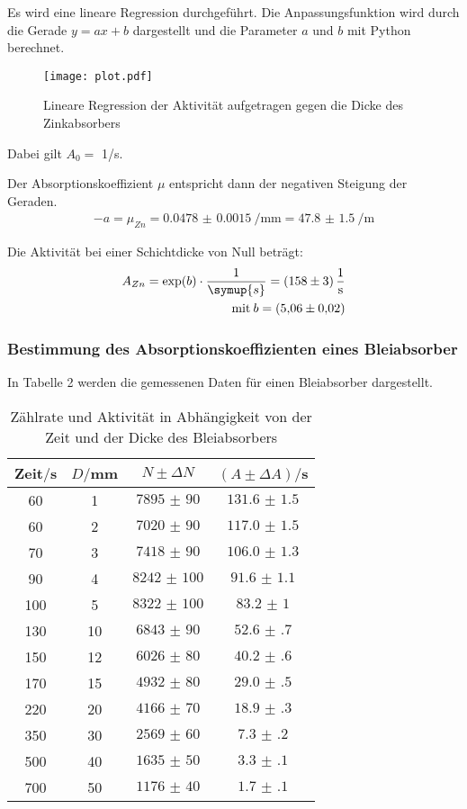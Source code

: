 Es wird eine lineare Regression durchgeführt. Die Anpassungsfunktion wird durch die Gerade $y = ax + b$  dargestellt und die Parameter $a$ und $b$
mit Python berechnet.

\begin{figure}[H]
  \centering
  \texttt{[image: plot.pdf]}
  \caption{Lineare Regression der Aktivität aufgetragen gegen die Dicke des Zinkabsorbers}
  \label{fig:plot}
\end{figure}

Dabei gilt $A_0 =$ 1/s.

Der Absorptionskoeffizient $\mu$ entspricht dann der negativen Steigung der Geraden.
\begin{align*}
  -a = \mu_{Zn} = \SI{0.0478(15)}{\per\milli\meter} = \SI{47.8(15)}{\per\meter}
\end{align*}

Die Aktivität bei einer Schichtdicke von Null beträgt:
\begin{align*}
  A_{Zn} = \exp(b) \cdot \frac{1}{\symup{s}} = \SI{158(3)}{\per\second} \\
  \text{mit} \: b = \SI{5.06(2)}{}
\end{align*}

\subsubsection{Bestimmung des Absorptionskoeffizienten eines Bleiabsorber}

In Tabelle 2 werden die gemessenen Daten für einen Bleiabsorber dargestellt.

\begin{table}[H]
  \centering
  \caption{Zählrate und Aktivität in Abhängigkeit von der Zeit und der Dicke des Bleiabsorbers}
  \label{tab:Rechteckspannung}
  \begin{tabular}{c c c c}
    \toprule
    Zeit$/$s & $D/$mm & $N \pm \Delta N$ & $(A \pm \Delta A)/$s\\
    \midrule
    60 & 1 & $\num{7895(90)}$  &  $\num{131.6(15)}$ \\
    60 & 2 & $\num{7020(90)}$ &   $\num{117.0(15)}$ \\
    70 & 3 & $\num{7418(90)}$ &   $\num{106.0(13)}$ \\
    90 & 4 & $\num{8242(100)}$ &  $\num{91.6(11)}$ \\
    100 & 5 & $\num{8322(100)}$ & $\num{83.2(10)}$ \\
    130 & 10 & $\num{6843(90)}$ & $\num{52.6(7)}$ \\
    150 & 12 & $\num{6026(80)}$ & $\num{40.2(6)}$ \\
    170 & 15 & $\num{4932(80)}$ & $\num{29.0(5)}$ \\
    220 & 20 & $\num{4166(70)}$ & $\num{18.9(3)}$ \\
    350 & 30 & $\num{2569(60)}$ & $\num{7.3(2)}$ \\
    500 & 40 & $\num{1635(50)}$ & $\num{3.3(1)}$ \\
    700 & 50 & $\num{1176(40)}$ & $\num{1.7(1)}$ \\
    \bottomrule
  \end{tabular}
\end{table}

